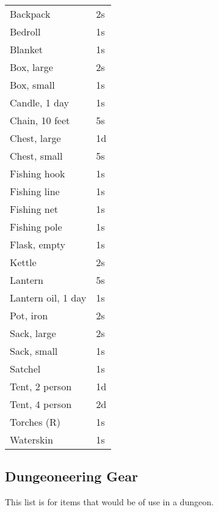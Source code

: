 \begin{center}
{
\begin{xtabular}{|l|l|}
Backpack & 2s \\
Bedroll & 1s \\
Blanket & 1s \\
Box, large & 2s \\
Box, small & 1s \\
Candle, 1 day & 1s \\
Chain, 10 feet & 5s \\
Chest, large & 1d \\
Chest, small & 5s \\
Fishing hook & 1s \\
Fishing line & 1s \\
Fishing net & 1s \\
Fishing pole & 1s \\
Flask, empty & 1s \\
Kettle & 2s \\
Lantern & 5s \\
Lantern oil, 1 day & 1s \\
Pot, iron & 2s \\
Sack, large & 2s \\
Sack, small & 1s \\
Satchel & 1s \\
Tent, 2 person & 1d \\
Tent, 4 person & 2d \\
Torches (R) & 1s \\
Waterskin & 1s \\
\hline
\end{xtabular}
}
\end{center}

\subsection{Dungeoneering Gear}

This list is for items that would be of use in a dungeon.

